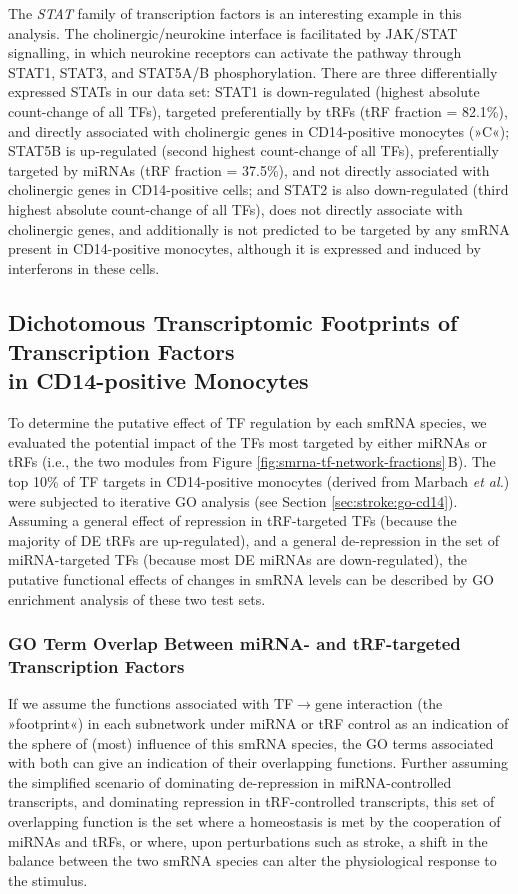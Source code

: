 The \emph{STAT} family of transcription factors is an interesting example in this analysis. The cholinergic/neurokine interface is facilitated by JAK/STAT signalling, in which neurokine receptors can activate the pathway through STAT1, STAT3, and STAT5A/B phosphorylation. There are three differentially expressed STATs in our data set: STAT1 is down-regulated (highest absolute count-change of all TFs), targeted preferentially by tRFs (tRF fraction = 82.1\%), and directly associated with cholinergic genes in CD14-positive monocytes (»C«); STAT5B is up-regulated (second highest count-change of all TFs), preferentially targeted by miRNAs (tRF fraction = 37.5\%), and not directly associated with cholinergic genes in CD14-positive cells; and STAT2 is also down-regulated (third highest absolute count-change of all TFs), does not directly associate with cholinergic genes, and additionally is not predicted to be targeted by any smRNA present in CD14-positive monocytes, although it is expressed and induced by interferons in these cells.\cite{Lehtonen1997} 

\subsection{Dichotomous Transcriptomic Footprints of Transcription Factors\\ in CD14-positive Monocytes}
To determine the putative effect of TF regulation by each smRNA species, we evaluated the potential impact of the TFs most targeted by either miRNAs or tRFs (i.e., the two modules from Figure \ref{fig:smrna-tf-network-fractions}\,B). The top 10\% of TF targets in CD14-positive monocytes (derived from Marbach \emph{et al.}\cite{Marbach2016}) were subjected to iterative GO analysis (see Section \ref{sec:stroke:go-cd14}). Assuming a general effect of repression in tRF-targeted TFs (because the majority of DE tRFs are up-regulated), and a general de-repression in the set of miRNA-targeted TFs (because most DE miRNAs are down-regulated), the putative functional effects of changes in smRNA levels can be described by GO enrichment analysis of these two test sets.

\subsubsection{GO Term Overlap Between miRNA- and tRF-targeted Transcription Factors}
If we assume the functions associated with TF$\to$gene interaction (the »footprint«) in each subnetwork under miRNA or tRF control as an indication of the sphere of (most) influence of this smRNA species, the GO terms associated with both can give an indication of their overlapping functions. Further assuming the simplified scenario of dominating de-repression in miRNA-controlled transcripts, and dominating repression in tRF-controlled transcripts, this set of overlapping function is the set where a homeostasis is met by the cooperation of miRNAs and tRFs, or where, upon perturbations such as stroke, a shift in the balance between the two smRNA species can alter the physiological response to the stimulus.


